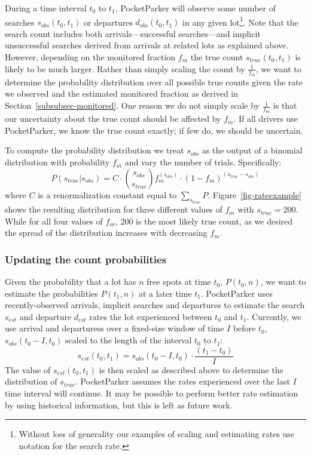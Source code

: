 During a time interval $t_0$ to $t_1$, PocketParker will observe some number
of searches $s_{obs}(t_0, t_1)$ or departures $d_{obs}(t_0, t_1)$ in any
given lot\footnote{Without loss of generality our examples of scaling and
estimating rates use notation for the search rate.}. Note that the search
count includes both arrivals---successful searches---and implicit
unsuccessful searches derived from arrivals at related lots as explained
above. However, depending on the monitored fraction $f_m$ the true count
$s_{true}(t_0, t_1)$ is likely to be much larger. Rather than simply scaling
the count by $\frac{1}{f_m}$, we want to determine the probability
distribution over all possible true counts given the rate we observed and the
estimated monitored fraction as derived in Section~\ref{subsubsec-monitored}.
One reason we do not simply scale by $\frac{1}{f_m}$ is that our uncertainty
about the true count should be affected by $f_m$. If all drivers use
PocketParker, we know the true count exactly; if few do, we should be
uncertain.

To compute the probability distribution we treat $s_{obs}$ as the output of a
binomial distribution with probability $f_m$ and vary the number of trials.
Specifically:
%
\begin{equation} P(s_{true}| s_{obs}) = C \cdot {s_{obs} \choose s_{true}}
f_m^{(s_{obs})} \cdot (1 - f_m)^{(s_{true} - s_{obs})} \end{equation}
%
where $C$ is a renormalization constant equal to $\sum_{s_{true}} P$.
Figure~\ref{fig-rateexample} shows the resulting distribution for three
different values of $f_m$ with $s_{true} = 200$. While for all four values of
$f_m$, 200 is the most likely true count, as we desired the spread of the
distribution increases with decreasing $f_m$.

\subsubsection{Updating the count probabilities}

Given the probability that a lot has $n$ free spots at time $t_0$, $P(t_0,
n)$, we want to estimate the probabilities $P(t_1, n)$ at a later time $t_1$.
PocketParker uses recently-observed arrivals, implicit searches and
departures to estimate the search $s_{est}$ and departure $d_{est}$ rates the
lot experienced between $t_0$ and $t_1$. Currently, we use arrival and
departuress over a fixed-size window of time $I$ before $t_0$, $s_{obs}(t_0 -
I, t_0)$ scaled to the length of the interval $t_0$ to $t_1$:
%
\[s_{est}(t_0, t_1) = s_{obs}(t_0 - I, t_0) \cdot \frac{(t_1 - t_0)}{I} \]
%
The value of $s_{est}(t_0, t_1)$ is then scaled as described above to
determine the distribution of $s_{true}$. PocketParker assumes the rates
experienced over the last $I$ time interval will continue. It may be possible
to perform better rate estimation by using historical information, but this
is left as future work.

